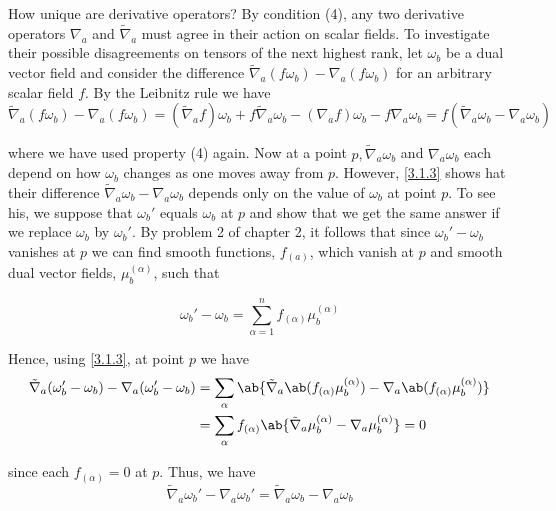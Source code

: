 How unique are derivative operators? By condition (4), any two derivative operators $\nabla_a$ and $\tilde{\nabla}_a$ must agree in their action on scalar fields. To investigate their possible disagreements on tensors of the next highest rank, let $\omega_b$ be a dual vector field and consider the difference $\tilde{\nabla}_a(f\omega_b)-\nabla_a(f\omega_b)$ for an arbitrary scalar field $f$. By the Leibnitz rule we have
\begin{equation}
    \tilde{\nabla}_a(f\omega_b)-\nabla_a(f\omega_b)=(\tilde{\nabla}_af)\omega_b+f\tilde{\nabla}_a\omega_b-(\nabla_af)\omega_b-f\nabla_a\omega_b=f(\tilde{\nabla}_a\omega_b-\nabla_a\omega_b)    
    \label{3.1.3}
\end{equation}

where we have used property (4) again. Now at a point $p,\tilde{\nabla}_a\omega_b$ and $\nabla_a\omega_b$ each depend on how $\omega_b$ changes as one moves away from $p$. However, \eqref{3.1.3} shows hat their difference $\tilde{\nabla}_a\omega_b-\nabla_a\omega_b$ depends only on the value of $\omega_b$ at point $p$. To see his, we suppose that $\omega_b'$ equals $\omega_b$ at $p$ and show that we get the same answer if we replace $\omega_b$ by $\omega_b'$. By problem 2 of chapter 2, it follows that since $\omega_b'-\omega_b$ vanishes at $p$ we can find smooth functions, $f_{(a)}$, which vanish at $p$ and smooth dual vector fields, $\mu_b^{(\alpha)}$, such that

\begin{equation}
    \omega_b'-\omega_b=\sum_{\alpha=1}^{n}f_{(\alpha)}\mu_b^{(\alpha)}
    \label{3.1.4}
\end{equation}

Hence, using \eqref{3.1.3}, at point $p$ we have
\begin{equation}
\begin{aligned}
    \tilde{\nabla}_a(\omega_b'-\omega_b)-\nabla_a(\omega_b'-\omega_b)&=\sum_{\alpha}\ab\{\tilde{\nabla}_a\ab(f_{(\alpha)}\mu_b^{(\alpha)})-\nabla_a\ab(f_{(\alpha)}\mu_b^{(\alpha)})\}\\
    &=\sum_{\alpha}f_{(\alpha)}\ab\{\tilde{\nabla}_a\mu_b^{(\alpha)}-\nabla_a\mu_b^{(\alpha)}\}=0
\end{aligned}
\label{3.1.5}
\end{equation}

since each $f_{(\alpha)}=0$ at $p$. Thus, we have
\begin{equation}
    \tilde{\nabla}_a\omega_b'-\nabla_a\omega_b'=\tilde{\nabla}_a\omega_b-\nabla_a\omega_b
    \label{3.1.6}
\end{equation}

